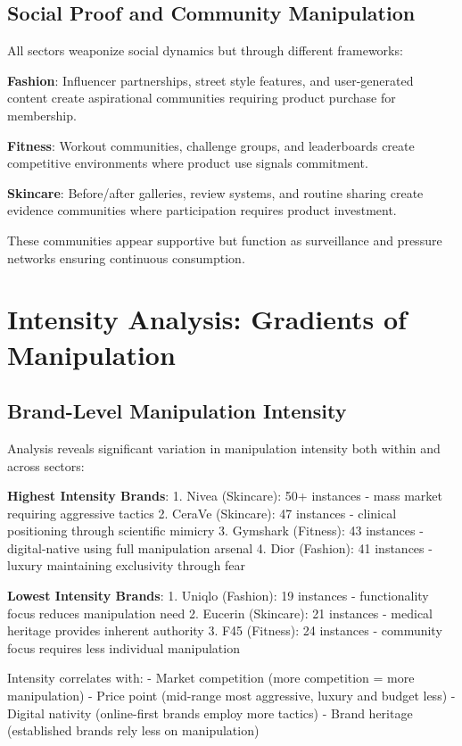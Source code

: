 \subsection{Social Proof and Community Manipulation}

All sectors weaponize social dynamics but through different frameworks:

\textbf{Fashion}: Influencer partnerships, street style features, and user-generated content create aspirational communities requiring product purchase for membership.

\textbf{Fitness}: Workout communities, challenge groups, and leaderboards create competitive environments where product use signals commitment.

\textbf{Skincare}: Before/after galleries, review systems, and routine sharing create evidence communities where participation requires product investment.

These communities appear supportive but function as surveillance and pressure networks ensuring continuous consumption.

\section{Intensity Analysis: Gradients of Manipulation}
\label{sec:intensity}

\subsection{Brand-Level Manipulation Intensity}

Analysis reveals significant variation in manipulation intensity both within and across sectors:

\textbf{Highest Intensity Brands}:
1. Nivea (Skincare): 50+ instances - mass market requiring aggressive tactics
2. CeraVe (Skincare): 47 instances - clinical positioning through scientific mimicry
3. Gymshark (Fitness): 43 instances - digital-native using full manipulation arsenal
4. Dior (Fashion): 41 instances - luxury maintaining exclusivity through fear

\textbf{Lowest Intensity Brands}:
1. Uniqlo (Fashion): 19 instances - functionality focus reduces manipulation need
2. Eucerin (Skincare): 21 instances - medical heritage provides inherent authority
3. F45 (Fitness): 24 instances - community focus requires less individual manipulation

Intensity correlates with:
- Market competition (more competition = more manipulation)
- Price point (mid-range most aggressive, luxury and budget less)
- Digital nativity (online-first brands employ more tactics)
- Brand heritage (established brands rely less on manipulation)

